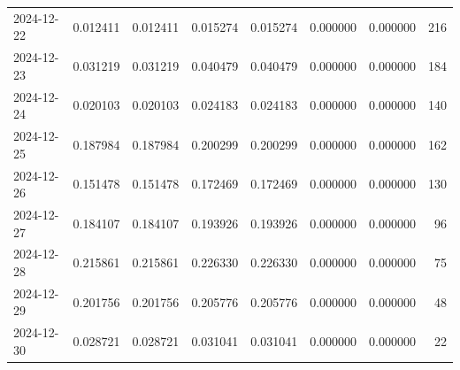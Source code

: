 \begin{tabular}{lrrrrrrr}
2024-12-22 & 0.012411 & 0.012411 & 0.015274 & 0.015274 & 0.000000 & 0.000000 & 216 \\
2024-12-23 & 0.031219 & 0.031219 & 0.040479 & 0.040479 & 0.000000 & 0.000000 & 184 \\
2024-12-24 & 0.020103 & 0.020103 & 0.024183 & 0.024183 & 0.000000 & 0.000000 & 140 \\
2024-12-25 & 0.187984 & 0.187984 & 0.200299 & 0.200299 & 0.000000 & 0.000000 & 162 \\
2024-12-26 & 0.151478 & 0.151478 & 0.172469 & 0.172469 & 0.000000 & 0.000000 & 130 \\
2024-12-27 & 0.184107 & 0.184107 & 0.193926 & 0.193926 & 0.000000 & 0.000000 & 96 \\
2024-12-28 & 0.215861 & 0.215861 & 0.226330 & 0.226330 & 0.000000 & 0.000000 & 75 \\
2024-12-29 & 0.201756 & 0.201756 & 0.205776 & 0.205776 & 0.000000 & 0.000000 & 48 \\
2024-12-30 & 0.028721 & 0.028721 & 0.031041 & 0.031041 & 0.000000 & 0.000000 & 22 \\
\bottomrule
\end{tabular}
